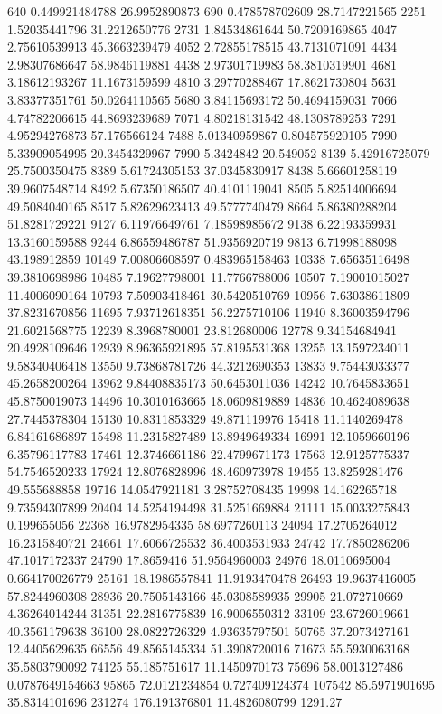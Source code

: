 640     0.449921484788  26.9952890873
690     0.478578702609  28.7147221565
2251    1.52035441796   31.2212650776
2731    1.84534861644   50.7209169865
4047    2.75610539913   45.3663239479
4052    2.72855178515   43.7131071091
4434    2.98307686647   58.9846119881
4438    2.97301719983   58.3810319901
4681    3.18612193267   11.1673159599
4810    3.29770288467   17.8621730804
5631    3.83377351761   50.0264110565
5680    3.84115693172   50.4694159031
7066    4.74782206615   44.8693239689
7071    4.80218131542   48.1308789253
7291    4.95294276873   57.176566124
7488    5.01340959867   0.804575920105
7990    5.33909054995   20.3454329967
7990    5.3424842       20.549052
8139    5.42916725079   25.7500350475
8389    5.61724305153   37.0345830917
8438    5.66601258119   39.9607548714
8492    5.67350186507   40.4101119041
8505    5.82514006694   49.5084040165
8517    5.82629623413   49.5777740479
8664    5.86380288204   51.8281729221
9127    6.11976649761   7.18598985672
9138    6.22193359931   13.3160159588
9244    6.86559486787   51.9356920719
9813    6.71998188098   43.198912859
10149   7.00806608597   0.483965158463
10338   7.65635116498   39.3810698986
10485   7.19627798001   11.7766788006
10507   7.19001015027   11.4006090164
10793   7.50903418461   30.5420510769
10956   7.63038611809   37.8231670856
11695   7.93712618351   56.2275710106
11940   8.36003594796   21.6021568775
12239   8.3968780001    23.812680006
12778   9.34154684941   20.4928109646
12939   8.96365921895   57.8195531368
13255   13.1597234011   9.58340406418
13550   9.73868781726   44.3212690353
13833   9.75443033377   45.2658200264
13962   9.84408835173   50.6453011036
14242   10.7645833651   45.8750019073
14496   10.3010163665   18.0609819889
14836   10.4624089638   27.7445378304
15130   10.8311853329   49.871119976
15418   11.1140269478   6.84161686897
15498   11.2315827489   13.8949649334
16991   12.1059660196   6.35796117783
17461   12.3746661186   22.4799671173
17563   12.9125775337   54.7546520233
17924   12.8076828996   48.460973978
19455   13.8259281476   49.555688858
19716   14.0547921181   3.28752708435
19998   14.162265718    9.73594307899
20404   14.5254194498   31.5251669884
21111   15.0033275843   0.199655056
22368   16.9782954335   58.6977260113
24094   17.2705264012   16.2315840721
24661   17.6066725532   36.4003531933
24742   17.7850286206   47.1017172337
24790   17.8659416      51.9564960003
24976   18.0110695004   0.664170026779
25161   18.1986557841   11.9193470478
26493   19.9637416005   57.8244960308
28936   20.7505143166   45.0308589935
29905   21.072710669    4.36264014244
31351   22.2816775839   16.9006550312
33109   23.6726019661   40.3561179638
36100   28.0822726329   4.93635797501
50765   37.2073427161   12.4405629635
66556   49.8565145334   51.3908720016
71673   55.5930063168   35.5803790092
74125   55.185751617    11.1450970173
75696   58.0013127486   0.0787649154663
95865   72.0121234854   0.727409124374
107542  85.5971901695   35.8314101696
231274  176.191376801   11.4826080799
1291.27
